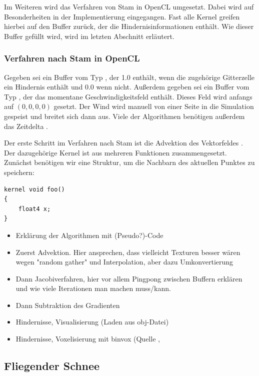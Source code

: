 Im Weiteren wird das Verfahren von Stam in OpenCL umgesetzt. Dabei wird auf
Besonderheiten in der Implementierung eingegangen. Fast alle Kernel greifen
hierbei auf den Buffer zurück, der die Hindernisinformationen enthält. Wie
dieser Buffer gefüllt wird, wird im letzten Abschnitt erläutert.

\subsubsection{Verfahren nach Stam in OpenCL}

Gegeben sei ein Buffer  vom Typ
, der 1.0 enthält, wenn die zugehörige Gitterzelle ein
Hindernis enthält und 0.0 wenn nicht. Außerdem gegeben sei ein Buffer
 vom Typ , der das
momentane Geschwindigkeitsfeld enthält. Dieses Feld wird anfangs auf $(0,0,0,0)$
gesetzt. Der Wind wird manuell von einer Seite in die Simulation gespeist und
breitet sich dann aus. Viele der Algorithmen benötigen außerdem das Zeitdelta
.

Der erste Schritt im Verfahren nach Stam ist die Advektion des Vektorfeldes
. Der dazugehörige Kernel ist aus mehreren
Funktionen zusammengesetzt. Zunächst benötigen wir eine Struktur, um die
Nachbarn des aktuellen Punktes zu speichern:

\begin{lstlisting}
kernel void foo()
{
	float4 x;
}
\end{lstlisting}

\begin{itemize}
\item Erklärung der Algorithmen mit (Pseudo?)-Code
\item Zuerst Advektion. Hier ansprechen, dass vielleicht Texturen besser wären
wegen "random gather" und Interpolation, aber dazu Umkonvertierung
\item Dann Jacobiverfahren, hier vor allem Pingpong zwischen Buffern erklären
und wie viele Iterationen man machen muss/kann.
\item Dann Subtraktion des Gradienten
\item Hindernisse, Visualisierung (Laden aus obj-Datei)
\item Hindernisse, Voxelisierung mit binvox (Quelle \cite{Nooruddin2003}, \cite{binvox2012}
\end{itemize}

\subsection{Fliegender Schnee}

